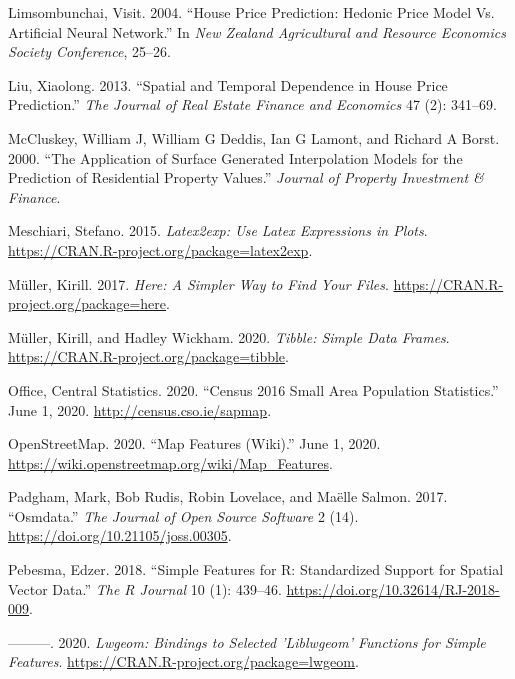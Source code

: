 \documentclass[conference,final,]{IEEEtran}
\begin{document}
\leavevmode\hypertarget{ref-limsombunchai2004house}{}%
Limsombunchai, Visit. 2004. ``House Price Prediction: Hedonic Price Model Vs. Artificial Neural Network.'' In \emph{New Zealand Agricultural and Resource Economics Society Conference}, 25--26.

\leavevmode\hypertarget{ref-liu2013spatial}{}%
Liu, Xiaolong. 2013. ``Spatial and Temporal Dependence in House Price Prediction.'' \emph{The Journal of Real Estate Finance and Economics} 47 (2): 341--69.

\leavevmode\hypertarget{ref-mccluskey2000application}{}%
McCluskey, William J, William G Deddis, Ian G Lamont, and Richard A Borst. 2000. ``The Application of Surface Generated Interpolation Models for the Prediction of Residential Property Values.'' \emph{Journal of Property Investment \& Finance}.

\leavevmode\hypertarget{ref-R-latex2exp}{}%
Meschiari, Stefano. 2015. \emph{Latex2exp: Use Latex Expressions in Plots}. \url{https://CRAN.R-project.org/package=latex2exp}.

\leavevmode\hypertarget{ref-R-here}{}%
Müller, Kirill. 2017. \emph{Here: A Simpler Way to Find Your Files}. \url{https://CRAN.R-project.org/package=here}.

\leavevmode\hypertarget{ref-R-tibble}{}%
Müller, Kirill, and Hadley Wickham. 2020. \emph{Tibble: Simple Data Frames}. \url{https://CRAN.R-project.org/package=tibble}.

\leavevmode\hypertarget{ref-cso2020}{}%
Office, Central Statistics. 2020. ``Census 2016 Small Area Population Statistics.'' June 1, 2020. \url{http://census.cso.ie/sapmap}.

\leavevmode\hypertarget{ref-openstreetmap2020}{}%
OpenStreetMap. 2020. ``Map Features (Wiki).'' June 1, 2020. \url{https://wiki.openstreetmap.org/wiki/Map_Features}.

\leavevmode\hypertarget{ref-R-osmdata}{}%
Padgham, Mark, Bob Rudis, Robin Lovelace, and Maëlle Salmon. 2017. ``Osmdata.'' \emph{The Journal of Open Source Software} 2 (14). \url{https://doi.org/10.21105/joss.00305}.

\leavevmode\hypertarget{ref-R-sf}{}%
Pebesma, Edzer. 2018. ``Simple Features for R: Standardized Support for Spatial Vector Data.'' \emph{The R Journal} 10 (1): 439--46. \url{https://doi.org/10.32614/RJ-2018-009}.

\leavevmode\hypertarget{ref-R-lwgeom}{}%
---------. 2020. \emph{Lwgeom: Bindings to Selected 'Liblwgeom' Functions for Simple Features}. \url{https://CRAN.R-project.org/package=lwgeom}.
\end{document}
